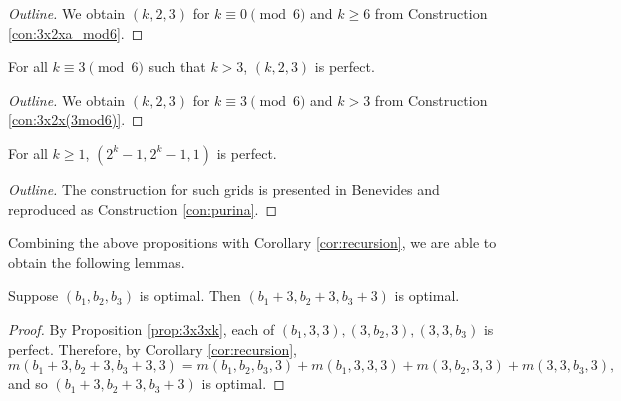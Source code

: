 \begin{proof}[Outline]
We obtain $(k,2,3)$ for $k \equiv 0 \pmod 6$ and $k \geq 6$ from Construction \ref{con:3x2xa_mod6}. 
\end{proof}

\begin{prop}
\label{prop:2x3xk_3}
For all $k \equiv 3 \pmod 6$ such that $k>3$, $(k,2,3)$ is perfect.
\end{prop}

\begin{proof}[Outline]
We obtain $(k,2,3)$ for $k \equiv 3 \pmod 6$ and $k > 3$ from Construction \ref{con:3x2x(3mod6)}.
\end{proof}

\begin{prop}
\label{prop:purina}
For all $k \geq 1$, $(2^k-1,2^k-1,1)$ is perfect.
\end{prop}

\begin{proof}[Outline]
The construction for such grids is presented in Benevides and reproduced as Construction \ref{con:purina}.
\end{proof}

Combining the above propositions with Corollary \ref{cor:recursion}, we are able to obtain the following lemmas.

\begin{lem}
\label{lem:plus_333}
Suppose $(b_1, b_2, b_3)$ is optimal. Then $(b_1+3, b_2+3, b_3+3)$ is optimal. 
\end{lem}

\begin{proof}
By Proposition \ref{prop:3x3xk}, each of $(b_1,3,3), (3,b_2,3),(3,3,b_3)$ is perfect. Therefore, by Corollary \ref{cor:recursion}, 
$$m(b_1+3, b_2+3, b_3+3, 3) = m(b_1,b_2,b_3,3) + m(b_1,3,3,3) + m(3,b_2,3,3) + m(3,3,b_3,3),$$
and so $(b_1+3, b_2+3, b_3+3)$ is optimal.
\end{proof}




